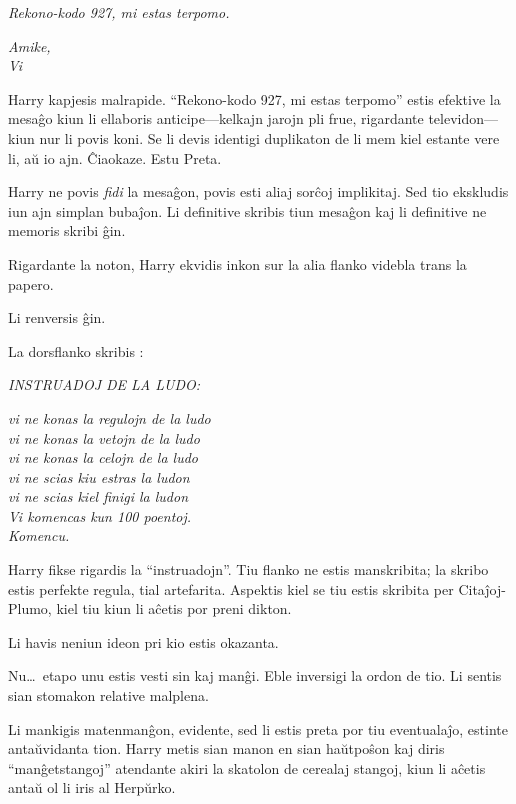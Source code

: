 \emph{Rekono-kodo 927, mi estas terpomo.}

\emph{Amike,\\
  Vi}

\medskip

Harry kapjesis malrapide. ``Rekono-kodo 927, mi estas terpomo'' estis
efektive la mesaĝo kiun li ellaboris anticipe—kelkajn jarojn pli frue,
rigardante televidon—kiun nur li povis koni. Se li devis identigi
duplikaton de li mem kiel estante vere li, aŭ io ajn. Ĉiaokaze. Estu Preta.

Harry ne povis \emph{fidi} la mesaĝon, povis esti aliaj sorĉoj
implikitaj. Sed tio ekskludis iun ajn simplan bubaĵon. Li definitive
skribis tiun mesaĝon kaj li definitive ne memoris skribi ĝin.

Rigardante la noton, Harry ekvidis inkon sur la alia flanko videbla
trans la papero.

Li renversis ĝin.

La dorsflanko skribis :
\medskip

\begin{center}
  \emph{INSTRUADOJ DE LA LUDO:}

  \emph{vi ne konas la regulojn de la ludo\\
    vi ne konas la vetojn de la ludo\\
    vi ne konas la celojn de la ludo\\
    vi ne scias kiu estras la ludon\\
    vi ne scias kiel finigi la ludon\\
    Vi komencas kun 100 poentoj.\\
    Komencu.}
\end{center}

\medskip

Harry fikse rigardis la ``instruadojn''. Tiu flanko ne estis
manskribita; la skribo estis perfekte regula, tial
artefarita. Aspektis kiel se tiu estis skribita per Citaĵoj-Plumo,
kiel tiu kiun li aĉetis por preni dikton.

Li havis neniun ideon pri kio estis okazanta.

Nu\ldots~etapo unu estis vesti sin kaj manĝi. Eble inversigi la ordon
de tio. Li sentis sian stomakon relative malplena.

Li mankigis matenmanĝon, evidente, sed li estis preta por tiu eventualaĵo, estinte
antaŭvidanta tion. Harry metis sian manon en sian haŭtpoŝon kaj diris
``manĝetstangoj'' atendante akiri la skatolon de cerealaj stangoj, kiun li
aĉetis antaŭ ol li iris al Herpŭrko.

